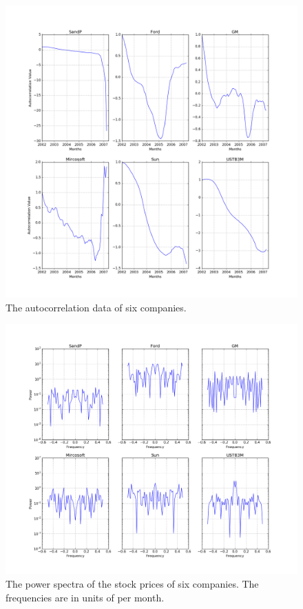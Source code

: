 \documentclass[11pt, letterpage, twocolumn]{article}
\begin{document}
\begin{figure}
  \includegraphics[width=\linewidth]{stocks_ac.png}
  \caption{
    The autocorrelation data of six companies.
  }
  \label{fig:stocks_ac}
\end{figure}

\begin{figure}
  \includegraphics[width=\linewidth]{stocks_power_spectrum.png}
  \caption{
    The power spectra of the stock prices of six companies. The frequencies are
    in units of per month.
  }
  \label{fig:stocks_ps}
\end{figure}
\end{document}
